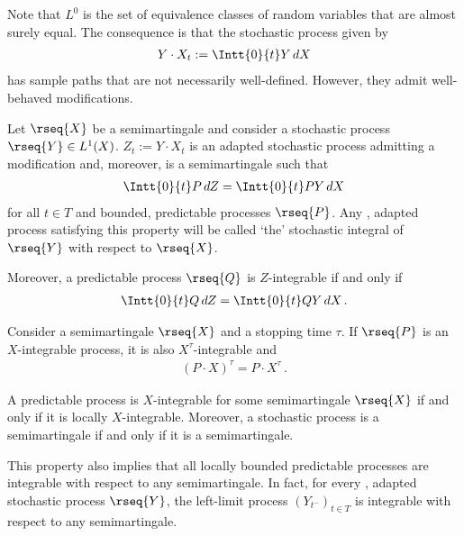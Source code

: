     Note that $L^0$ is the set of equivalence classes of random variables that are almost surely equal. The consequence is that the stochastic process given by
    \begin{gather}
        Y\cdot X_t := \Intt{0}{t}Y\,dX
    \end{gather}
    has sample paths that are not necessarily well-defined. However, they admit well-behaved modifications.
    \begin{property}
        Let $\rseq{X}$ be a semimartingale and consider a stochastic process $\rseq{Y}\in L^1(X)$. $Z_t := Y\cdot X_t$ is an adapted stochastic process admitting a \cdlg modification and, moreover, is a semimartingale such that
        \begin{gather}
            \Intt{0}{t}P\,dZ = \Intt{0}{t}PY\,dX
        \end{gather}
        for all $t\in T$ and bounded, predictable processes $\rseq{P}$. Any \cdlgg, adapted process satisfying this property will be called `the' stochastic integral of $\rseq{Y}$ with respect to $\rseq{X}$.

        Moreover, a predictable process $\rseq{Q}$ is $Z$-integrable if and only if
        \begin{gather}
            \Intt{0}{t}Q\,dZ = \Intt{0}{t}QY\,dX\,.
        \end{gather}
    \end{property}

    \begin{property}
        Consider a semimartingale $\rseq{X}$ and a stopping time $\tau$. If $\rseq{P}$ is an $X$-integrable process, it is also $X^\tau$-integrable and
        \begin{gather}
            \left(P\cdot X\right)^\tau = P\cdot X^\tau\,.
        \end{gather}
    \end{property}

    \begin{property}
        A predictable process is $X$-integrable for some semimartingale $\rseq{X}$ if and only if it is locally $X$-integrable. Moreover, a stochastic process is a semimartingale if and only if it is a semimartingale.

        This property also implies that all locally bounded predictable processes are integrable with respect to any semimartingale. In fact, for every \cdlgg, adapted stochastic process $\rseq{Y}$, the left-limit process $(Y_{t^-})_{t\in T}$ is integrable with respect to any semimartingale.
    \end{property}

